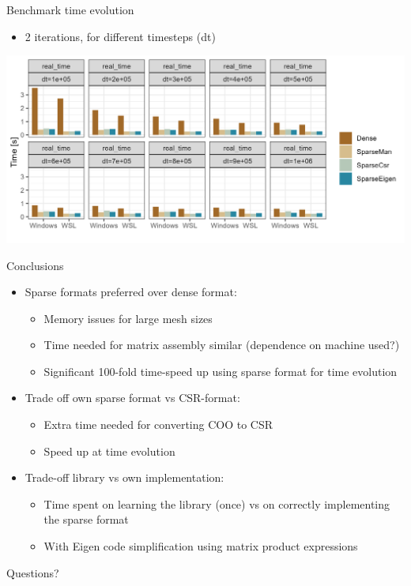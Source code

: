 \documentclass[aspectratio=169,xcolor=dvipsnames]{beamer}
\begin{document}
\begin{frame}{Benchmark time evolution}
   
    \begin{itemize}
        \item 2 iterations, for different timesteps (dt)
    \end{itemize}
    
    \begin{center}
   \includegraphics[width=0.9\linewidth]{ode_bench_result.png}
   \end{center}
   
\end{frame}


\begin{frame}{Conclusions}
   \begin{itemize}
      \item Sparse formats preferred over dense format:
   	 \begin{itemize}
   	  \item Memory issues for large mesh sizes
	  \item Time needed for matrix assembly similar (dependence on machine used?)
	  \item Significant 100-fold time-speed up using sparse format for time evolution
     \end{itemize}
   	 \item Trade off own sparse format vs CSR-format:
   	 \begin{itemize}
	  \item Extra time needed for converting COO to CSR 
	  \item Speed up at time evolution
	  
	  \end{itemize}
	  \item Trade-off library vs own implementation:
	  \begin{itemize}
	  \item Time spent on learning the library (once) vs on correctly implementing the sparse format
	  \item With Eigen code simplification using matrix product expressions
	  \end{itemize}
   \end{itemize}
\end{frame}


\begin{frame}
    \Huge{\centerline{Questions?}}
\end{frame}
\end{document}

